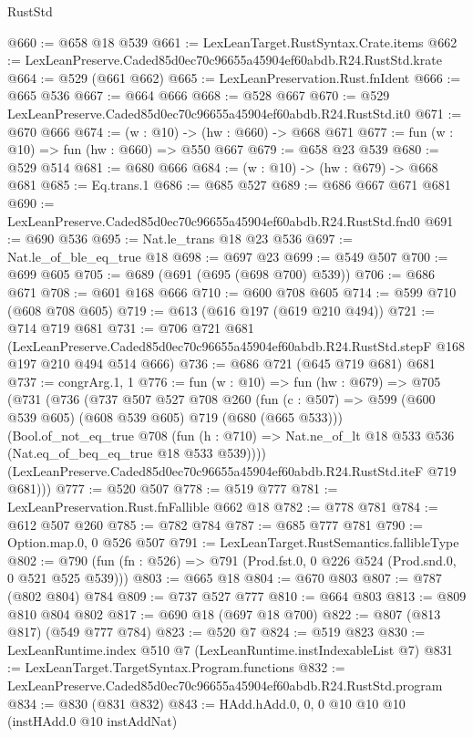 \begin{lexlean}{RustStd}
\begin{coremodule}
@660 := @658 @18 @539
@661 := LexLeanTarget.RustSyntax.Crate.items
@662 := LexLeanPreserve.Caded85d0ec70c96655a45904ef60abdb.R24.RustStd.krate
@664 := @529 (@661 @662)
@665 := LexLeanPreservation.Rust.fnIdent
@666 := @665 @536
@667 := @664 @666
@668 := @528 @667
@670 := @529 LexLeanPreserve.Caded85d0ec70c96655a45904ef60abdb.R24.RustStd.it0
@671 := @670 @666
@674 := (w : @10) -> (hw : @660) -> @668 @671
@677 := fun (w : @10) => fun (hw : @660) => @550 @667
@679 := @658 @23 @539
@680 := @529 @514
@681 := @680 @666
@684 := (w : @10) -> (hw : @679) -> @668 @681
@685 := Eq.trans.{1}
@686 := @685 @527
@689 := @686 @667 @671 @681
@690 := LexLeanPreserve.Caded85d0ec70c96655a45904ef60abdb.R24.RustStd.fnd0
@691 := @690 @536
@695 := Nat.le_trans @18 @23 @536
@697 := Nat.le_of_ble_eq_true @18
@698 := @697 @23
@699 := @549 @507
@700 := @699 @605
@705 := @689 (@691 (@695 (@698 @700) @539))
@706 := @686 @671
@708 := @601 @168 @666
@710 := @600 @708 @605
@714 := @599 @710 (@608 @708 @605)
@719 := @613 (@616 @197 (@619 @210 @494))
@721 := @714 @719 @681
@731 := @706
    @721
    @681
    (LexLeanPreserve.Caded85d0ec70c96655a45904ef60abdb.R24.RustStd.stepF
      @168
      @197
      @210
      @494
      @514
      @666)
@736 := @686 @721 (@645 @719 @681) @681
@737 := congrArg.{1, 1}
@776 := fun (w : @10) =>
  fun (hw : @679) =>
  @705
    (@731
      (@736
        (@737
          @507
          @527
          @708
          @260
          (fun (c : @507) => @599 (@600 @539 @605) (@608 @539 @605) @719 (@680 (@665 @533)))
          (Bool.of_not_eq_true
            @708
            (fun (h : @710) => Nat.ne_of_lt @18 @533 @536 (Nat.eq_of_beq_eq_true @18 @533 @539))))
        (LexLeanPreserve.Caded85d0ec70c96655a45904ef60abdb.R24.RustStd.iteF @719 @681)))
@777 := @520 @507
@778 := @519 @777
@781 := LexLeanPreservation.Rust.fnFallible @662 @18
@782 := @778 @781
@784 := @612 @507 @260
@785 := @782 @784
@787 := @685 @777 @781
@790 := Option.map.{0, 0} @526 @507
@791 := LexLeanTarget.RustSemantics.fallibleType
@802 := @790 (fun (fn : @526) => @791 (Prod.fst.{0, 0} @226 @524 (Prod.snd.{0, 0} @521 @525 @539)))
@803 := @665 @18
@804 := @670 @803
@807 := @787 (@802 @804) @784
@809 := @737 @527 @777
@810 := @664 @803
@813 := @809 @810 @804 @802
@817 := @690 @18 (@697 @18 @700)
@822 := @807 (@813 @817) (@549 @777 @784)
@823 := @520 @7
@824 := @519 @823
@830 := LexLeanRuntime.index @510 @7 (LexLeanRuntime.instIndexableList @7)
@831 := LexLeanTarget.TargetSyntax.Program.functions
@832 := LexLeanPreserve.Caded85d0ec70c96655a45904ef60abdb.R24.RustStd.program
@834 := @830 (@831 @832)
@843 := HAdd.hAdd.{0, 0, 0} @10 @10 @10 (instHAdd.{0} @10 instAddNat)

\end{coremodule}
\end{lexlean}
